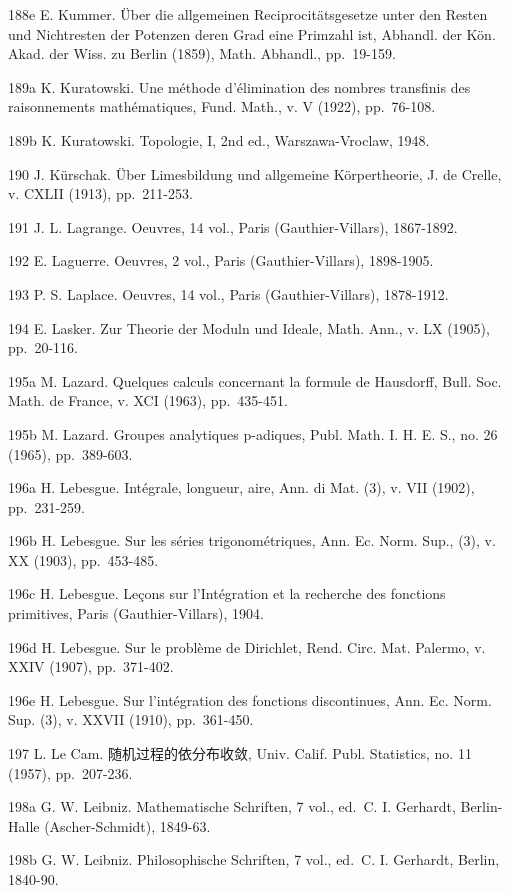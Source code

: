 188e E. Kummer. Über die allgemeinen Reciprocitätsgesetze unter den Resten und Nichtresten der Potenzen deren Grad eine Primzahl ist, Abhandl. der Kön. Akad. der Wiss. zu Berlin (1859), Math. Abhandl., pp.~19-159.

189a K. Kuratowski. Une méthode d'élimination des nombres transfinis des raisonnements mathématiques, Fund. Math., v. V (1922), pp.~76-108.

189b K. Kuratowski. Topologie, I, 2nd ed., Warszawa-Vroclaw, 1948.

190 J. Kürschak. Über Limesbildung und allgemeine Körpertheorie, J. de Crelle, v. CXLII (1913), pp.~211-253.

191 J. L. Lagrange. Oeuvres, 14 vol., Paris (Gauthier-Villars), 1867-1892.

192 E. Laguerre. Oeuvres, 2 vol., Paris (Gauthier-Villars), 1898-1905.

193 P. S. Laplace. Oeuvres, 14 vol., Paris (Gauthier-Villars), 1878-1912.

194 E. Lasker. Zur Theorie der Moduln und Ideale, Math. Ann., v. LX (1905), pp.~20-116.

195a M. Lazard. Quelques calculs concernant la formule de Hausdorff, Bull. Soc. Math. de France, v. XCI (1963), pp.~435-451.

195b M. Lazard. Groupes analytiques p-adiques, Publ. Math. I. H. E. S., no. 26 (1965), pp.~389-603.

196a H. Lebesgue. Intégrale, longueur, aire, Ann. di Mat. (3), v. VII (1902), pp.~231-259.

196b H. Lebesgue. Sur les séries trigonométriques, Ann. Ec. Norm. Sup., (3), v. XX (1903), pp.~453-485.

196c H. Lebesgue. Leçons sur l'Intégration et la recherche des fonctions primitives, Paris (Gauthier-Villars), 1904.

196d H. Lebesgue. Sur le problème de Dirichlet, Rend. Circ. Mat. Palermo, v. XXIV (1907), pp.~371-402.

196e H. Lebesgue. Sur l'intégration des fonctions discontinues, Ann. Ec. Norm. Sup. (3), v. XXVII (1910), pp.~361-450.

197 L. Le Cam. 随机过程的依分布收敛, Univ. Calif. Publ. Statistics, no. 11 (1957), pp.~207-236.

198a G. W. Leibniz. Mathematische Schriften, 7 vol., ed.~C. I. Gerhardt, Berlin-Halle (Ascher-Schmidt), 1849-63.

198b G. W. Leibniz. Philosophische Schriften, 7 vol., ed.~C. I. Gerhardt, Berlin, 1840-90.

